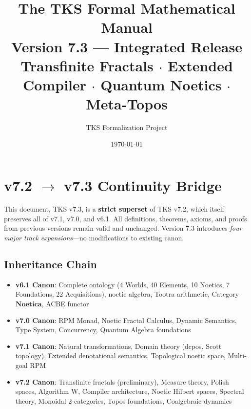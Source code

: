 \documentclass[11pt,twoside,openright]{book}
\title{\Huge\textbf{The TKS Formal Mathematical Manual}\\[0.5em]
       \Large Version 7.3 --- Integrated Release\\[0.3em]
       \large Transfinite Fractals $\cdot$ Extended Compiler $\cdot$ Quantum Noetics $\cdot$ Meta-Topos}
\author{TKS Formalization Project}
\date{\today}
\theoremstyle{definition}
\theoremstyle{plain}
\theoremstyle{remark}
\newcommand{\Noetica}{\mathbf{Noetica}}
\begin{document}
\frontmatter
\maketitle


\chapter*{v7.2 $\to$ v7.3 Continuity Bridge}

\begin{tcolorbox}[colback=yellow!10!white,colframe=orange!75!black,title=\textbf{Canonical Inheritance Declaration}]
This document, TKS v7.3, is a \textbf{strict superset} of TKS v7.2, which itself preserves all of v7.1, v7.0, and v6.1. All definitions, theorems, axioms, and proofs from previous versions remain valid and unchanged. Version 7.3 introduces \textit{four major track expansions}---no modifications to existing canon.
\end{tcolorbox}

\section*{Inheritance Chain}

\begin{itemize}
  \item \textbf{v6.1 Canon}: Complete ontology (4 Worlds, 40 Elements, 10 Noetics, 7 Foundations, 22 Acquisitions), noetic algebra, Tootra arithmetic, Category $\Noetica$, ACBE functor
  \item \textbf{v7.0 Canon}: RPM Monad, Noetic Fractal Calculus, Dynamic Semantics, Type System, Concurrency, Quantum Algebra foundations
  \item \textbf{v7.1 Canon}: Natural transformations, Domain theory (dcpos, Scott topology), Extended denotational semantics, Topological noetic space, Multi-goal RPM
  \item \textbf{v7.2 Canon}: Transfinite fractals (preliminary), Measure theory, Polish spaces, Algorithm W, Compiler architecture, Noetic Hilbert spaces, Spectral theory, Monoidal 2-categories, Topos foundations, Coalgebraic dynamics
\end{itemize}
\end{document}
